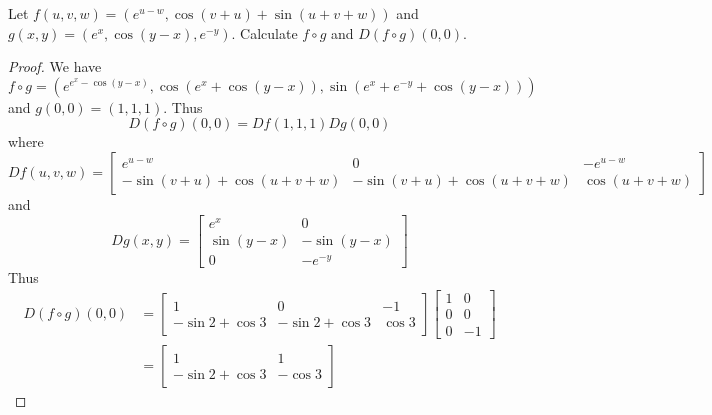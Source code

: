 \documentclass[openany]{book}
\begin{document}
\begin{prob}[2.5, Q8]
    Let \( f(u, v, w) = (e^{u-w}, \cos (v + u) + \sin (u + v + w)) \) and \( g(x, y) = (e^x, \cos (y - x), e^{-y}). \)  
   Calculate \( f \circ g \) and \( D(f \circ g)(0, 0)\).
\end{prob}
\begin{proof}
    We have 
    \begin{equation*}
        f\circ g =(e^{e^x-\cos(y-x)}, \cos(e^x+\cos(y-x)), \sin(e^{x}+e^{-y}+\cos(y-x)))
    \end{equation*}
    and $g(0,0)=(1, 1, 1)$. Thus 
    \begin{equation*}
        D(f\circ g)(0,0)=Df(1,1,1)Dg(0,0)
    \end{equation*}
    where 
    \begin{equation*}
        Df(u,v,w)=\begin{bmatrix}
            e^{u-w}&0&-e^{u-w}\\
            -\sin(v+u)+\cos(u+v+w)&-\sin(v+u)+\cos(u+v+w)&\cos(u+v+w)
        \end{bmatrix}
    \end{equation*}
    and 
    \begin{equation*}
        Dg(x,y)=\begin{bmatrix}
            e^x&0\\
            \sin(y-x)&-\sin(y-x)\\
            0&-e^{-y}
        \end{bmatrix}
    \end{equation*}
    Thus 
    \begin{align*}
        D(f\circ g)(0,0)&=\begin{bmatrix}
            1&0&-1\\
            -\sin 2+\cos 3&-\sin 2+\cos 3&\cos 3
        \end{bmatrix}\begin{bmatrix}
            1&0\\
            0&0\\
            0&-1
        \end{bmatrix}\\
        &=\begin{bmatrix}
            1&1\\
            -\sin 2+\cos 3&-\cos 3
        \end{bmatrix}
    \end{align*}
\end{proof}
\end{document}
